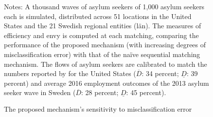 \documentclass[12pt,fleqn]{article}
\begin{document}
\begin{figure}
	\caption{The proposed mechanism's sensitivity to misclassification error \label{FIG-miclassification}}
	\vspace{-0.7em}
	\vspace{-0.7em}
	\vspace{-0.7em}

	{\scriptsize \vspace{-1em}
	\begin{singlespace}
		{\sc Notes:} A thousand waves of asylum seekers of 1,000 asylum seekers each is simulated, distributed across 51 locations in the United States and the 21 Swedish regional entities (l{\"a}n). The measures of efficiency and envy is computed at each matching, comparing the performance of the proposed mechanism (with increasing degrees of misclassification error) with that of the na\"{i}ve sequential matching mechanism. The flows of asylum seekers are calibrated to match the numbers reported by \cite{bib:BansakEtAl} for the United States ($\overline{D}$: 34 percent; $\underline{D}$: 39 percent) and average 2016 employment outcomes of the 2013 asylum seeker wave in Sweden ($\overline{D}$: 28 percent; $\underline{D}$: 45 percent).
	\end{singlespace}
	 }
\end{figure}
\end{document}

